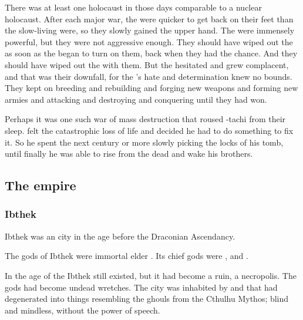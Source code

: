 There was at least one holocaust in those days comparable to a nuclear holocaust. 
After each major war, the \aryothim were quicker to get back on their feet than the slow-living \quiljaaran were, so they slowly gained the upper hand. 
The \ophidians were immensely powerful, but they were not aggressive enough.
They should have wiped out the \aryothim as soon as the \aryothim began to turn on them, back when they had the chance.
And they should have wiped out the \nephilim with them.
But the \ophidians hesitated and grew complacent, and that was their downfall, for the \aryothim's hate and determination knew no bounds. 
They kept on breeding and rebuilding and forging new weapons and forming new armies and attacking and destroying and conquering until they had won. 

Perhaps it was one such war of mass destruction that roused \Nexagglachel-tachi from their sleep. 
\Nexagglachel felt the catastrophic loss of life and decided he had to do something to fix it. 
So he spent the next century or more slowly picking the locks of his tomb, until finally he was able to rise from the dead and wake his brothers. 









\subsection{The \aryoth empire}





\subsubsection{Ibthek}
Ibthek was an \aryoth city in the age before the Draconian Ascendancy. 

The gods of Ibthek were immortal elder \aryothim.
Its chief gods were ,  and .

In the age of the \VaimonCaliphate Ibthek still existed, but it had become a ruin, a necropolis. 
The gods had become undead wretches.
The city was inhabited by \humans and \nephilim that had degenerated into things resembling the ghouls from the Cthulhu Mythos; blind and mindless, without the power of speech.





